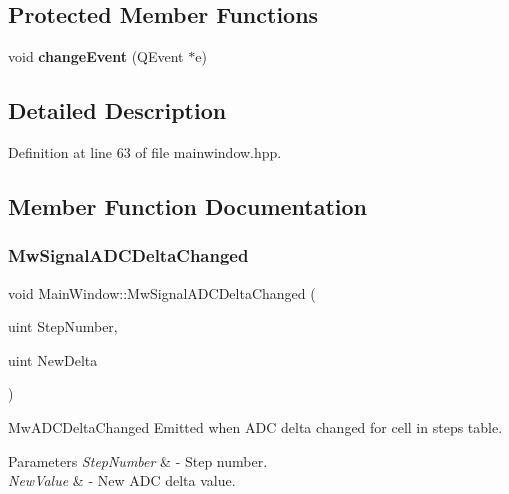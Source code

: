 \subsection*{Protected Member Functions}
\begin{DoxyCompactItemize}
\item 
\mbox{\label{class_main_window_af4ca5d0d3d18ddcb7d54b6596bbf4797}} 
void {\bfseries change\+Event} (Q\+Event $\ast$e)
\end{DoxyCompactItemize}


\subsection{Detailed Description}


Definition at line 63 of file mainwindow.\+hpp.



\subsection{Member Function Documentation}
\mbox{\label{class_main_window_a37ea64ccb9b5bcf9bb976602d42aadfa}} 
\subsubsection{\texorpdfstring{Mw\+Signal\+A\+D\+C\+Delta\+Changed}{MwSignalADCDeltaChanged}}
{\footnotesize\ttfamily void Main\+Window\+::\+Mw\+Signal\+A\+D\+C\+Delta\+Changed (\begin{DoxyParamCaption}\item[{uint}]{Step\+Number,  }\item[{uint}]{New\+Delta }\end{DoxyParamCaption})\hspace{0.3cm}{\ttfamily [signal]}}



Mw\+A\+D\+C\+Delta\+Changed Emitted when A\+DC delta changed for cell in steps table. 


\begin{DoxyParams}{Parameters}
{\em Step\+Number} & -\/ Step number. \\
\hline
{\em New\+Value} & -\/ New A\+DC delta value. \\
\hline
\end{DoxyParams}
\mbox{\label{class_main_window_a7b5fab96f0c2363958436141a3aae65b}} 
